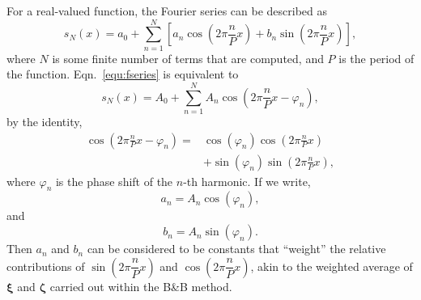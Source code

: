 \documentclass[reprint,superscriptaddress,nobibnotes,amsmath,amssymb,aip]{revtex4-2}
\begin{document}
For a real-valued function, the Fourier series can be described as 
%
\begin{equation}
    s_N(x) = a_0 + \sum_{n=1}^{N} \left[ a_n \cos \left( 2\pi \frac{n}{P} x \right) + b_n \sin \left( 2\pi \frac{n}{P} x \right) \right],
    \label{equ:fseries}
\end{equation}
%
where $N$ is some finite number of terms that are computed, and $P$ is the period of the function. 
Eqn.~\ref{equ:fseries} is equivalent to
%
\begin{equation}
    s_N(x) = A_0 + \sum_{n=1}^{N} A_n \cos\left(2\pi \frac{n}{P}x - \varphi_n\right),
\end{equation}
%
by the identity, 
%
\begin{equation}
    \begin{aligned}
        \cos \left( 2\pi \frac{n}{P} x - \varphi_n \right) = & \cos(\varphi_n) \cos \left( 2\pi \frac{n}{P} x \right)  \\ 
        & + \sin(\varphi_n) \sin \left( 2\pi \frac{n}{P} x \right),
    \end{aligned}
\end{equation}
where $\varphi_n$ is the phase shift of the $n$-th harmonic. 
If we write, 
%
\begin{equation}
    a_n = A_n \cos(\varphi_n),
\end{equation}
%
and
%
\begin{equation}
    b_n = A_n \sin(\varphi_n).
\end{equation}
%
Then $a_n$ and $b_n$ can be considered to be constants that ``weight'' the relative contributions of $\sin \left( 2\pi \dfrac{n}{P} x \right)$ and $\cos \left( 2\pi \dfrac{n}{P} x \right)$, akin to the weighted average of $\bm{\xi}$ and $\bm{\zeta}$ carried out within the B\&B method.
\end{document}
